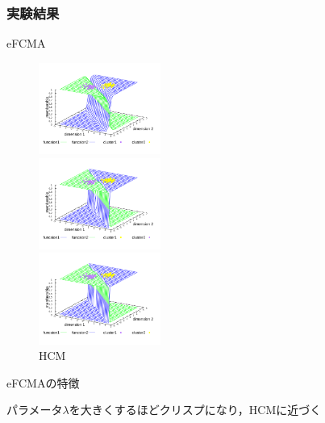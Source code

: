 \documentclass[13pt,dvipdfmx]{beamer}
\begin{document}
\begin{frame}\frametitle{実験結果}
  \begin{block}{eFCMA}
    \begin{figure}[htbp]
      \begin{minipage}{0.32\hsize}
        \begin{center}
          \includegraphics[width=40mm]{eFCMA-Lambda1.pdf}
        \end{center}
        \captionsetup{labelformat=empty,labelsep=none}
        \caption{$\lambda=1$}
        \label{fig:one}
      \end{minipage}
      \begin{minipage}{0.32\hsize}
        \begin{center}
          \includegraphics[width=40mm]{eFCMA-Lambda10.pdf}
        \end{center}
        \captionsetup{labelformat=empty,labelsep=none}
        \caption{$\lambda=10$}
        \label{fig:two}
      \end{minipage}
     \begin{minipage}{0.32\hsize}
        \begin{center}
          \includegraphics[width=40mm]{HCM.pdf}
        \end{center}
        \captionsetup{labelformat=empty,labelsep=none}
        \caption{HCM}
      \label{fig:three}
     \end{minipage}
    \end{figure}
  \end{block}
  \begin{block}{eFCMAの特徴}
    \begin{center}
      パラメータ$\lambda$を大きくするほどクリスプになり，HCMに近づく
    \end{center}
  \end{block}
\end{frame}
\end{document}
